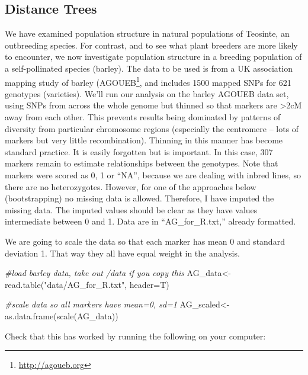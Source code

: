 \documentclass[
]{book}
\newenvironment{Shaded}{\begin{snugshade}}{\end{snugshade}}
\newcommand{\AttributeTok}[1]{\textcolor[rgb]{0.77,0.63,0.00}{#1}}
\newcommand{\CommentTok}[1]{\textcolor[rgb]{0.56,0.35,0.01}{\textit{#1}}}
\newcommand{\FunctionTok}[1]{\textcolor[rgb]{0.00,0.00,0.00}{#1}}
\newcommand{\NormalTok}[1]{#1}
\newcommand{\OtherTok}[1]{\textcolor[rgb]{0.56,0.35,0.01}{#1}}
\newcommand{\StringTok}[1]{\textcolor[rgb]{0.31,0.60,0.02}{#1}}
\renewcommand{\href}[2]{#2\footnote{\url{#1}}}
\begin{document}
\hypertarget{distance-trees}{%
\subsection{Distance Trees}\label{distance-trees}}

We have examined population structure in natural populations of Teosinte, an outbreeding species. For contrast, and to see what plant breeders are more likely to encounter, we now investigate population structure in a breeding population of a self-pollinated species (barley). The data to be used is from a UK association mapping study of barley (\href{http://agoueb.org}{AGOUEB}, and includes 1500 mapped SNPs for 621 genotypes (varieties). We'll run our analysis on the barley AGOUEB data set, using SNPs from across the whole genome but thinned so that markers are \textgreater2cM away from each other. This prevents results being dominated by patterns of diversity from particular chromosome regions (especially the centromere -- lots of markers but very little recombination). Thinning in this manner has become standard practice. It is easily forgotten but is important. In this case, 307 markers remain to estimate relationships between the genotypes. Note that markers were scored as 0, 1 or ``NA'', because we are dealing with inbred lines, so there are no heterozygotes. However, for one of the approaches below (bootstrapping) no missing data is allowed. Therefore, I have imputed the missing data. The imputed values should be clear as they have values intermediate between 0 and 1. Data are in ``AG\_for\_R.txt,'' already formatted.

We are going to scale the data so that each marker has mean 0 and standard deviation 1. That way they all have equal weight in the analysis.

\begin{Shaded}
\begin{Highlighting}[]
\CommentTok{\#load barley data, take out /data if you copy this}
\NormalTok{AG\_data}\OtherTok{\textless{}{-}}\FunctionTok{read.table}\NormalTok{(}\StringTok{"data/AG\_for\_R.txt"}\NormalTok{, }\AttributeTok{header=}\NormalTok{T)}

\CommentTok{\#scale data so all markers have mean=0, sd=1}
\NormalTok{AG\_scaled}\OtherTok{\textless{}{-}}\FunctionTok{as.data.frame}\NormalTok{(}\FunctionTok{scale}\NormalTok{(AG\_data))}
\end{Highlighting}
\end{Shaded}

Check that this has worked by running the following on your computer:
\end{document}

